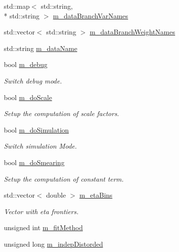 \begin{DoxyCompactItemize}
std\+::map$<$ std\+::string, \\*
std\+::string $>$ \hyperlink{classTemplateMethod_1_1Setting_a60a47fe8815221088fda9f6582726f30}{m\+\_\+data\+Branch\+Var\+Names}
\item 
std\+::vector$<$ std\+::string $>$ \hyperlink{classTemplateMethod_1_1Setting_af40c938ea700fb02b411416c90f132f6}{m\+\_\+data\+Branch\+Weight\+Names}
\item 
std\+::string \hyperlink{classTemplateMethod_1_1Setting_ad71ab877044f8623cd539f954e3904dc}{m\+\_\+data\+Name}
\item 
bool \hyperlink{classTemplateMethod_1_1Setting_a67320329e3515c9d02089a22e12ba035}{m\+\_\+debug}
\begin{DoxyCompactList}\small\item\em Switch debug mode. \end{DoxyCompactList}\item 
bool \hyperlink{classTemplateMethod_1_1Setting_ae343a8b736030a4904913d0b1236d0c9}{m\+\_\+do\+Scale}
\begin{DoxyCompactList}\small\item\em Setup the computation of scale factors. \end{DoxyCompactList}\item 
bool \hyperlink{classTemplateMethod_1_1Setting_a007b15c7f182fc60a83689641e769f79}{m\+\_\+do\+Simulation}
\begin{DoxyCompactList}\small\item\em Switch simulation Mode. \end{DoxyCompactList}\item 
bool \hyperlink{classTemplateMethod_1_1Setting_a4b6d1e590a09bbcb8fe096d2f5a61ae9}{m\+\_\+do\+Smearing}
\begin{DoxyCompactList}\small\item\em Setup the computation of constant term. \end{DoxyCompactList}\item 
std\+::vector$<$ double $>$ \hyperlink{classTemplateMethod_1_1Setting_a3797ecedd9b99cfff5b1c821abe4df01}{m\+\_\+eta\+Bins}
\begin{DoxyCompactList}\small\item\em Vector with eta frontiers. \end{DoxyCompactList}\item 
unsigned int \hyperlink{classTemplateMethod_1_1Setting_ad93b214aa1d5611fe4172efd16fab113}{m\+\_\+fit\+Method}
\item 
unsigned long \hyperlink{classTemplateMethod_1_1Setting_a8f4073fd2568a9eedf045fb4c06cda8e}{m\+\_\+indep\+Distorded}

\end{DoxyCompactItemize}
